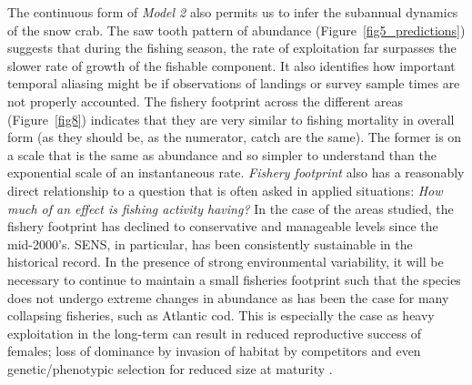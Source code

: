 \documentclass[
	letterpaper, %
	10pt, %
]{article}
\begin{document}
	The continuous form of \emph{Model 2} also permits us to infer the subannual
	dynamics of the snow crab. The saw tooth pattern of abundance (Figure~\ref{fig5_predictions}) suggests that during the fishing season, the rate of exploitation
	far surpasses the slower rate of growth of the fishable component.
	It also identifies how important temporal aliasing might be if observations
	of landings or survey sample times are not properly accounted.
	The fishery footprint across the different areas (Figure~\ref{fig8}) indicates
	that they are very similar to fishing mortality in overall form (as
	they should be, as the numerator, catch are the same). The former
	is on a scale that is the same as abundance and so simpler to understand
	than the exponential scale of an instantaneous rate. \emph{Fishery
	footprint} also has a reasonably direct relationship to a question
	that is often asked in applied situations: \emph{How much of an effect
	is fishing activity having?} In the case of the areas studied, the
	fishery footprint has declined to conservative and manageable levels
	since the mid-2000's. SENS, in particular, has been consistently sustainable
	in the historical record. In the presence of strong environmental
	variability, it will be necessary to continue to maintain a small
	fisheries footprint such that the species does not undergo extreme
	changes in abundance as has been the case for many collapsing fisheries, such as Atlantic cod. This is especially the case as heavy exploitation in the long-term can result in reduced reproductive success of females; loss of dominance by invasion of habitat by competitors and even genetic/phenotypic selection for reduced size at maturity \cite{Comeau_Conan_1992, Choi_2011}.
	 
\end{document}
